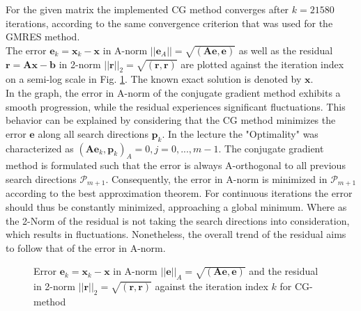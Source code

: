 \documentclass[11pt,a4paper]{article}
\newcommand{\refFig}[1]{Fig. \ref{#1}}
\begin{document}
For the given matrix the implemented CG method converges after $k = 21580$ iterations, according to the same convergence criterion that was used for the GMRES method.\\
%
The error $\mathbf{e}_k = \mathbf{x}_k - \mathbf{x}$ in A-norm $||\mathbf{e}_A|| = \sqrt{(\mathbf{Ae}, \mathbf{e})}$ as well as the residual $\mathbf{r} = \mathbf{Ax} - \mathbf{b}$ in 2-norm $||\mathbf{r}||_2 = \sqrt{(\mathbf{r}, \mathbf{r})}$ are plotted against the iteration index on a semi-log scale in \refFig{fig::CGNorms}. The known exact solution is denoted by $\mathbf{x}$.\\
%
In the graph, the error in A-norm of the conjugate gradient method exhibits a smooth progression, while the residual experiences significant fluctuations. This behavior can be explained by considering that the CG method minimizes the error $\mathbf{e}$ along all search directions $\mathbf{p}_k$. In the lecture the "Optimality" was characterized as $(\mathbf{Ae}_k, \mathbf{p}_k)_A = 0, j = 0,...,m-1$. The conjugate gradient method is formulated such that the error is always A-orthogonal to all previous search directions $\mathcal{P}_{m+1}$. Consequently, the error in A-norm is minimized in $\mathcal{P}_{m+1}$ according to the best approximation theorem. For continuous iterations the error should thus be constantly minimized, approaching a global minimum. Where as the 2-Norm of the residual is not taking the search directions into consideration, which results in fluctuations. Nonetheless, the overall trend of the residual aims to follow that of the error in A-norm.
%
\begin{figure}[!htbp]
	\centering
	\hspace*{0.8cm}
	\leavevmode
	\resizebox{0.9\width}{!}{}
	\caption{Error $\mathbf{e}_k = \mathbf{x}_k - \mathbf{x} $ in A-norm $||\mathbf{e}||_A = \sqrt{(\mathbf{Ae}, \mathbf{e})}$ and the residual in 2-norm $||\mathbf{r}||_2 = \sqrt{(\mathbf{r}, \mathbf{r})}$ against the iteration index $k$ for CG-method}
	\label{fig::CGNorms}
\end{figure}
\end{document}
